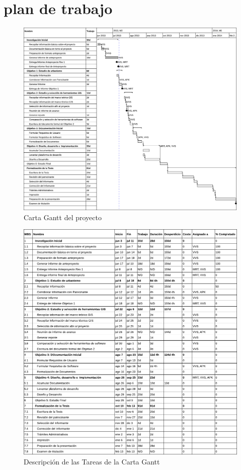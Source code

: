 \documentclass[12pt]{article}
\begin{document}

\newpage
\section{plan de trabajo}
\begin{figure}[!h]
    \caption{Carta Gantt del proyecto}
    \includegraphics[scale=.9,angle=90]{imagenes/gantt.pdf}
\end{figure}

\begin{figure}[!hp]
    \caption{Descripción de las Tareas de la Carta Gantt}
    \includegraphics[scale=1]{imagenes/tareas.pdf}
\end{figure}
\end{document}
